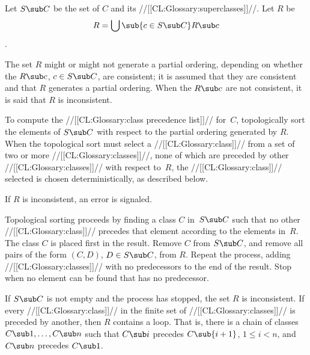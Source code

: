 Let $S\sub C$ be the set of $C$ and its //[[CL:Glossary:superclasses]]//. Let $R$ be
$$R=\bigcup\sub{c\in {S\sub C}}R\sub c$$.


The set $R$ might or might not generate a partial ordering, depending on
whether the $R\sub c$, $c\in S\sub C$, are 
consistent; it is assumed
that they are consistent and that $R$ generates a partial ordering.
When the $R\sub c$ are not consistent, it is said that $R$ is inconsistent.















To compute the //[[CL:Glossary:class precedence list]]// for~$C$\negthinspace,
topologically sort the elements of $S\sub C$ with respect to the
partial ordering generated by $R$\negthinspace.  When the topological
sort must select a //[[CL:Glossary:class]]// from a set of two or more 
//[[CL:Glossary:classes]]//, none of
which are preceded by other //[[CL:Glossary:classes]]// with respect to~$R$\negthinspace,
the //[[CL:Glossary:class]]// selected is chosen deterministically, as described below.

If $R$ is inconsistent, an error is signaled.


\goodbreak









Topological sorting proceeds by finding a class $C$ in~$S\sub C$ such
that no other //[[CL:Glossary:class]]// precedes that element according to the elements
in~$R$\negthinspace.  The class $C$ is placed first in the result.
Remove $C$ from $S\sub C$, and remove all pairs of the form $(C,D)$,
$D\in S\sub C$, from $R$\negthinspace. Repeat the process, adding
//[[CL:Glossary:classes]]// with no predecessors to the end of the result.  Stop when no
element can be found that has no predecessor.

If $S\sub C$ is not empty and the process has stopped, the set $R$ is
inconsistent. If every //[[CL:Glossary:class]]// in the finite set of 
//[[CL:Glossary:classes]]// is preceded
by another, then $R$ contains a loop. That is, there is a chain of
classes $C\sub 1,\ldots,C\sub n$ such that $C\sub i$ precedes
$C\sub{i+1}$, $1\leq i<n$, and $C\sub n$ precedes $C\sub 1$.

